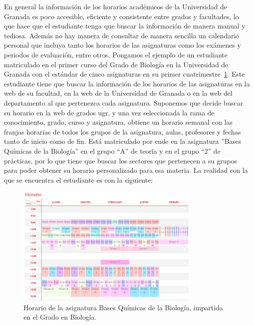 En general la información de los horarios académicos de la Universidad de Granada es poco accesible, eficiente y consistente entre grados y facultades, lo que hace que el estudiante tenga que buscar la información de manera manual y tediosa.
Además no hay manera de consultar de manera sencilla un calendario personal que incluya tanto los horarios de las asignaturas como los exámenes y periodos de evaluación, entre otros.
\newline\newline
Pongamos el ejemplo de un estudiante matriculado en el primer curso del Grado de Biología en la Universidad de Granada con el estándar de cinco asignaturas en su primer cuatrimestre~\ref{fig:horario_biologia}. 
Este estudiante tiene que buscar la información de los horarios de las asignaturas en la web de su facultad, en la web de la Universidad de Granada o en la web del departamento al que pertenezca cada asignatura.
Suponemos que decide buscar su horario en la web de grados ugr, y una vez seleccionada la rama de conocimiento, grado, curso y asignatura, obtiene un horario semanal con las franjas horarias de todos los grupos de la asignatura, aulas, profesores y fechas tanto de inicio como de fin.
Está matriculado por ende en la asignatura ''Bases Químicas de la Biología'' en el grupo ``A'' de teoría y en el grupo ``2'' de prácticas, por lo que tiene que buscar los sectores que pertenecen a su grupos para poder obtener su horario personalizado para esa materia.
\newline\newline
La realidad con la que se encuentra el estudiante es con la siguiente:

\begin{figure}[H]
    \centering
    \includegraphics[width=0.8\textwidth]{figures/02_horario_biologia.png}
    \caption{Horario de la asignatura Bases Químicas de la Biología, impartida en el Grado en Biología.}
    \label{fig:horario_biologia}
\end{figure}

